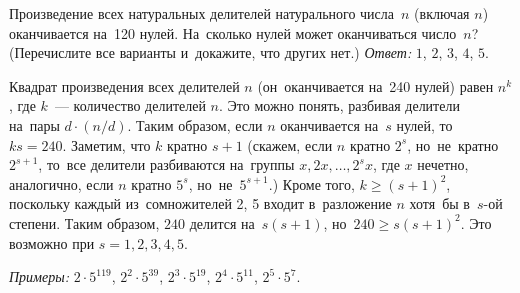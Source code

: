 \problem
Произведение всех натуральных делителей натурального числа~$n$ (включая $n$)
оканчивается на~120 нулей.
На~сколько нулей может оканчиваться число~$n$?
(Перечислите все варианты и~докажите, что других нет.)
\solution
\emph{Ответ:} $1$, $2$, $3$, $4$, $5$.
\par
Квадрат произведения всех делителей $n$ (он~оканчивается на~240 нулей)
равен $n^k$, где $k$~--- количество делителей $n$.
Это можно понять, разбивая делители на~пары $d \cdot (n / d)$.
Таким образом, если $n$ оканчивается на~$s$ нулей, то~$k s = 240$.
Заметим, что $k$ кратно $s+1$ (скажем, если $n$ кратно $2^s$, но~не~кратно
$2^{s+1}$, то~все делители разбиваются на~группы $x, 2x, \ldots, 2^s x$,
где $x$ нечетно, аналогично, если $n$ кратно $5^s$, но~не~$5^{s+1}$.)
Кроме того, $k \geq (s+1)^2$, поскольку каждый из~сомножителей 2, 5 входит
в~разложение $n$ хотя~бы в~$s$-ой степени.
Таким образом, $240$ делится на~$s (s + 1)$, но~$240 \geq s (s + 1)^2$.
Это возможно при $s = 1, 2, 3, 4, 5$.
\par
\emph{Примеры:} $2 \cdot 5^{119}$, $2^2 \cdot 5^{39}$, $2^3 \cdot 5^{19}$,
$2^4 \cdot 5^{11}$, $2^5 \cdot 5^{7}$. 
\endproblem
